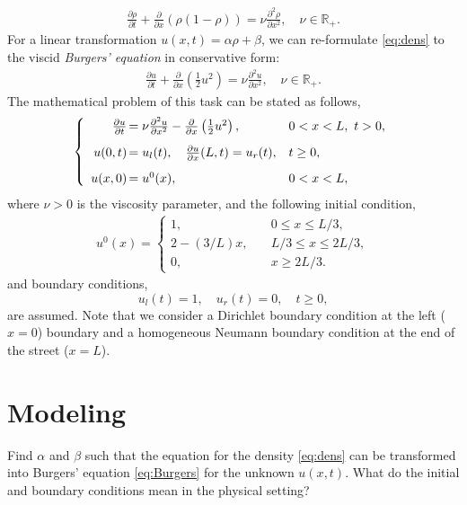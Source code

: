 \documentclass[a4paper,10pt]{article}
\begin{document}
\begin{align}
\label{eq:dens}
 \frac{\partial \rho}{\partial t} + \frac{\partial}{\partial x} \left( \rho (1-\rho) \right) = \nu \frac{\partial^2 \rho}{\partial x^2}, \quad \nu \in \mathbb{R}_+.
\end{align}
For a linear transformation $u(x,t) = \alpha \rho + \beta$, we can re-formulate \eqref{eq:dens} to the viscid \textit{Burgers' equation} in conservative form:
\begin{align}
\label{eq:Burgers}
 \frac{\partial u}{\partial t} + \frac{\partial}{\partial x} \left( \frac{1}{2}u^2 \right) = \nu \frac{\partial^2 u}{\partial x^2} , \quad \nu \in \mathbb{R}_+.
 \end{align}
 The mathematical problem of this task can be stated as follows,
 \begin{align*}
  \left\{ 
\begin{array}{rll}
 \frac{\partial u}{\partial t} \hspace{-0.3cm}&= \nu \frac{\partial^2 u}{\partial x^2} - \frac{\partial}{\partial x} \left( \frac{1}{2}u^2 \right), & 0<x<L, \ t > 0,  \\[2ex]
u(0,t)\hspace{-0.3cm}&=u_{l}(t), \quad \frac{\partial u}{\partial x}(L, t) = u_{r} (t), & t \geq 0,\\[2ex]
u(x,0) \hspace{-0.3cm}&= u^0(x), & 0<x<L,
\end{array}
\right.
\end{align*}
where $\nu > 0$ is the viscosity parameter, and the following initial condition, 
\begin{align}
\label{eq:init_cond}
 u^0(x) = \begin{cases}
           1, &\quad 0 \leq x \leq L/3, \\
           2-(3/L) x, &\quad L/3 \leq x \leq 2L/3,\\
           0, &\quad x \geq 2L/3.
          \end{cases}
\end{align}
and boundary conditions,
\[
 u_l(t) = 1, \quad u_r(t) = 0, \quad t \geq 0,
\]
are assumed. Note that we consider a Dirichlet boundary condition at the left ($x=0$) boundary and a homogeneous Neumann boundary condition at the end of the street ($x=L$). 
\section{Modeling}
Find $\alpha$ and $\beta$ such that the equation for the density \eqref{eq:dens} can be transformed into Burgers' equation \eqref{eq:Burgers} for the unknown $u(x,t)$. What do the initial and boundary conditions mean in the physical setting? 
\end{document}
